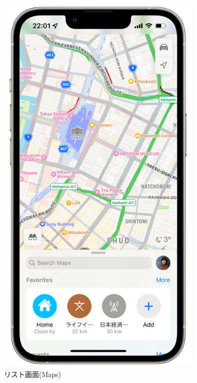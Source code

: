 \begin{figure}[htbp]
  \begin{minipage}{\hsize}
    \begin{center}
       \includegraphics[width=100mm]{img/Maps_screenshot.png}
    \end{center}
    \caption{リスト画面(Maps)}
    \label{fig:Maps_screenshot}
  \end{minipage}
\end{figure}

